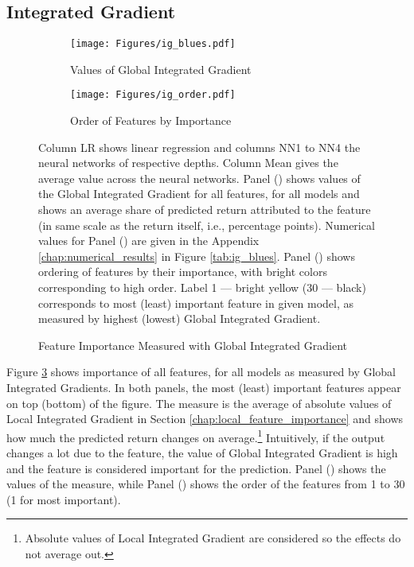 	\subsection{Integrated Gradient}
	
		\begin{figure}	
			\centering		
			\begin{subfigure}[t]{\textwidth}
				\texttt{[image: Figures/ig\_blues.pdf]}
				\caption{Values of Global Integrated Gradient}
				\label{fig:ig_blues}
			\end{subfigure}
			
			\begin{subfigure}[t]{\textwidth}
				\texttt{[image: Figures/ig\_order.pdf]}
				\caption{Order of Features by Importance}
				\label{fig:ig_order}
			\end{subfigure}
			\caption{Feature Importance Measured with Global Integrated Gradient}
			\medskip
			\small
			Column LR shows linear regression and columns NN1 to NN4 the neural networks of respective depths. Column Mean gives the average value across the neural networks. Panel () shows values of the Global Integrated Gradient for all features, for all models and shows an average share of predicted return attributed to the feature (in same scale as the return itself, i.e., percentage points).  Numerical values for Panel () are given in the Appendix \ref{chap:numerical_results} in Figure \ref{tab:ig_blues}. Panel () shows ordering of features by their importance, with bright colors corresponding to high order. Label 1 --- bright yellow (30 --- black) corresponds to most (least) important feature in given model, as measured by highest (lowest) Global Integrated Gradient. 
			\label{fig:ig_ensemble}
		\end{figure}
	
	
		Figure \ref{fig:ig_ensemble} shows importance of all features, for all models as measured by Global Integrated Gradients.  In both panels, the most (least) important features appear on top (bottom) of the figure. The measure is the average of absolute values of Local Integrated Gradient in Section \ref{chap:local_feature_importance} and shows how much the predicted return changes on average.\footnote{Absolute values of Local Integrated Gradient are considered so the effects do not average out.} Intuitively, if the output changes a lot due to the feature, the value of Global Integrated Gradient is high and the feature is considered important for the prediction. Panel () shows the values of the measure, while Panel () shows the order of the features from 1 to 30 (1 for most important).
		
